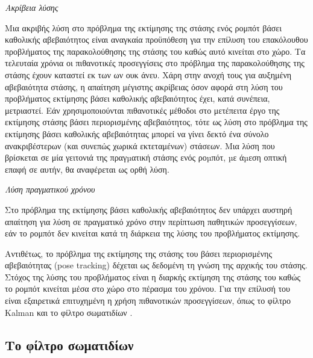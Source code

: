 \begin{gg_box}
\begin{remark}
  \label{remark:01_01_02_02:01}
  \textit{Ακρίβεια λύσης}

  Μια ακριβής λύση στο πρόβλημα της εκτίμησης της στάσης ενός ρομπότ βάσει
  καθολικής αβεβαιότητος είναι αναγκαία προϋπόθεση για την επίλυση του
  επακόλουθου προβλήματος της παρακολούθησης της στάσης του καθώς αυτό κινείται
  στο χώρο. Τα τελευταία χρόνια οι πιθανοτικές προσεγγίσεις στο πρόβλημα της
  παρακολούθησης της στάσης έχουν καταστεί εκ των ων ουκ άνευ. Χάρη στην
  ανοχή τους για αυξημένη αβεβαιότητα στάσης, η απαίτηση μέγιστης ακρίβειας
  όσον αφορά στη λύση του προβλήματος εκτίμησης βάσει καθολικής αβεβαιότητος
  έχει, κατά συνέπεια, μετριαστεί. Εάν χρησιμοποιούνται πιθανοτικές μέθοδοι στο
  μετέπειτα έργο της εκτίμησης στάσης βάσει περιορισμένης αβεβαιότητος, τότε ως
  λύση στο πρόβλημα της εκτίμησης βάσει καθολικής αβεβαιότητας μπορεί να γίνει
  δεκτό ένα σύνολο ανακριβέστερων (και συνεπώς χωρικά εκτεταμένων) στάσεων. Μια
  λύση που βρίσκεται σε μία γειτονιά της πραγµατική στάσης ενός ροµπότ, µε
  άµεση οπτική επαφή σε αυτήν, θα αναφέρεται ως ορθή λύση.
\end{remark}
\end{gg_box}


\begin{gg_box}
\begin{remark}
  \textit{Λύση πραγματικού χρόνου}
  \label{remark:01_01_02_02:02}

  Στο πρόβλημα της εκτίμησης βάσει καθολικής αβεβαιότητος δεν υπάρχει αυστηρή
  απαίτηση για λύση σε πραγματικό χρόνο στην περίπτωση παθητικών προσεγγίσεων,
  εάν το ρομπότ δεν κινείται κατά τη διάρκεια της λύσης του προβλήματος
  εκτίμησης.
\end{remark}
\end{gg_box}

Αντιθέτως, το πρόβλημα της εκτίμησης της στάσης του βάσει περιορισμένης
αβεβαιότητας (pose tracking) δέχεται ως δεδομένη τη γνώση της αρχικής του
στάσης. Στόχος της λύσης του προβλήματος είναι η διαρκής εκτίμηση της στάσης
του καθώς το ρομπότ κινείται μέσα στο χώρο στο πέρασμα του χρόνου. Για την
επίλυσή του είναι εξαιρετικά επιτυχημένη η χρήση πιθανοτικών προσεγγίσεων, όπως
το φίλτρο Kalman \cite{Maybeck1979} και το φίλτρο σωματιδίων
\cite{Thrun2002a,Gustafsson2002}.

\subsection{Το φίλτρο σωματιδίων}
\label{subsec:01_01_02_3}

